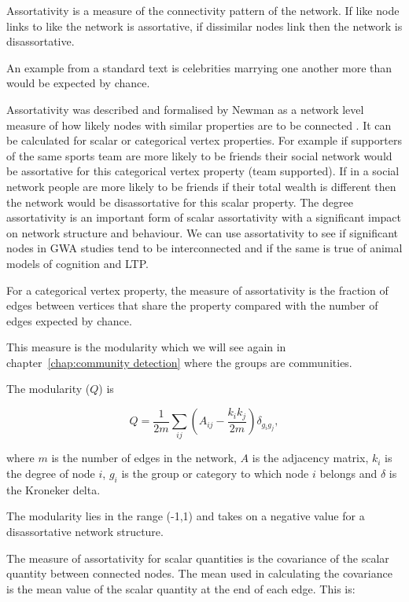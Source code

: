 Assortativity is a measure of the connectivity pattern of the network. If like node links to like the network is assortative, if dissimilar nodes link then the network is disassortative. 

An example from a standard text is celebrities marrying one another more than would be expected by chance\cite{barabasi2016network}.

Assortativity was described and formalised by Newman as a network level measure of how likely nodes with similar properties are to be connected \cite{newman2002assortative}. It can be calculated for scalar or categorical vertex properties. For example if supporters of the same sports team are more likely to be friends their social network would be assortative for this categorical vertex property (team supported). If in a social network people are more likely to be friends if their total wealth is different then the network would be disassortative for this scalar property. The degree assortativity is an important form of scalar assortativity  with a significant impact on network structure and behaviour. We can use assortativity to see if significant nodes in GWA studies tend to be interconnected and if the same is true of animal models of cognition and LTP. 

For a categorical vertex property, the measure of assortativity is the fraction of edges between vertices that share the property compared with the number of edges expected by chance.

This measure is the modularity which we will see again in chapter~\ref{chap:community detection} where the groups are communities. 

The modularity ($Q$) is

\begin{equation}
    Q = \frac{1}{2m}\sum_{ij}(A_{ij}-\frac{k_ik_j}{2m})\delta_{g_ig_j},
    \label{eq:categorical assortativity}
\end{equation}

where $m$ is the number of edges in the network, $A$ is the adjacency matrix, $k_i$ is the degree of node $i$, $g_i$ is the group or category to which node $i$ belongs and $\delta$ is the Kroneker delta. 

The modularity lies in the range (-1,1)
and takes on a negative value for a disassortative network structure.

The measure of assortativity for scalar quantities is the covariance of the scalar quantity between connected nodes. The mean used in calculating the covariance is the mean value of the scalar quantity at the end of each edge. This is:

